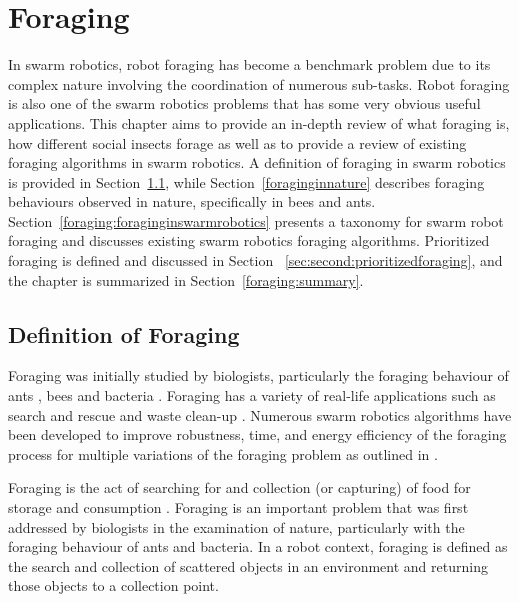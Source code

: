
\chapter{Foraging}
\label{chap:second}


In swarm robotics, robot foraging has become a benchmark problem due to its complex nature involving the coordination of numerous sub-tasks. Robot foraging is also one of the swarm robotics problems that has some very obvious useful applications. This chapter aims to provide an in-depth review of what foraging is, how different social insects forage as well as to provide a review of existing foraging algorithms in swarm robotics. A definition of foraging in swarm robotics is provided in Section~\ref{sec:second:definition}, while Section~\ref{foraginginnature} describes foraging behaviours observed in nature, specifically in bees and ants. Section~\ref{foraging:foraginginswarmrobotics} presents a taxonomy for swarm robot foraging and discusses existing swarm robotics foraging algorithms. Prioritized foraging is defined and discussed in Section~
\ref{sec:second:prioritizedforaging}, and the chapter is summarized in Section~\ref{foraging:summary}.



\section{Definition of Foraging}
\label{sec:second:definition}

Foraging was initially studied by biologists, particularly the foraging behaviour of ants \cite{holldobler1990ants,bernstein1974seasonal}, bees \cite{seeley2009wisdom} and bacteria \cite{resnick1994turtles}. Foraging has a variety of real-life applications such as search and rescue \cite{jennings1997cooperative,murphy2000biomimetic} and waste clean-up \cite{balch1995io}. Numerous swarm robotics algorithms have been developed to improve robustness, time, and energy efficiency of the foraging process for multiple variations of the foraging problem as outlined in \cite{winfield2009foraging}. 

Foraging is the act of searching for and collection (or capturing) of food for storage and consumption \cite{winfield2009foraging}. Foraging is an important problem that was first addressed by biologists in the examination of nature, particularly with the foraging behaviour of ants and bacteria. In a robot context, foraging is defined as the search and collection of scattered objects in an environment and returning those objects to a collection point.

